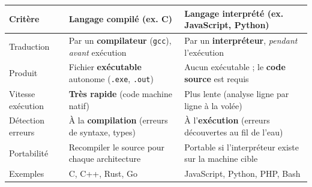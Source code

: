 \documentclass[11pt]{article}
\begin{document}
\begin{propriete}
\begin{center}
\begin{tabularx}{\linewidth}{|l|X|X|}
\hline
\rowcolor{popblueL} \textbf{Critère} & \textbf{Langage compilé (ex. C)} & \textbf{Langage interprété (ex. JavaScript, Python)} \\
\hline
Traduction & Par un \textbf{compilateur} (\texttt{gcc}), \emph{avant} exécution & Par un \textbf{interpréteur}, \emph{pendant} l'exécution \\
\hline
Produit & Fichier \textbf{exécutable} autonome (\texttt{.exe}, \texttt{.out}) & Aucun exécutable ; le \textbf{code source} est requis \\
\hline
Vitesse exécution & \textbf{Très rapide} (code machine natif) & Plus lente (analyse ligne par ligne à la volée) \\
\hline
Détection erreurs & À la \textbf{compilation} (erreurs de syntaxe, types) & À l'\textbf{exécution} (erreurs découvertes au fil de l'eau) \\
\hline
Portabilité & Recompiler le source pour chaque architecture & Portable si l'interpréteur existe sur la machine cible \\
\hline
Exemples & C, C++, Rust, Go & JavaScript, Python, PHP, Bash \\
\hline
\end{tabularx}
\end{center}
\end{propriete}
\end{document}
